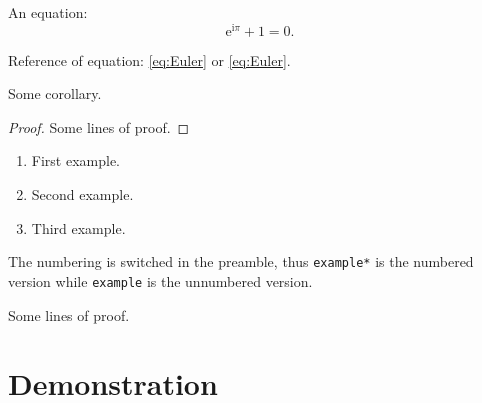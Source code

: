 \documentclass[a4paper, 11pt,
  use osf,
  use style = stream,
  title in boldface,
  theorem in new line,
  emphasize theorems,
  theorem numbering = section,
  simple name,  %
  name in link, %
]{simplivre}
\numberwithin{equation}{section}
\begin{document}
An equation:
\begin{equation}\label{eq:Euler}
  \mathrm{e}^{\mathrm{i}\pi} + 1 = 0.
\end{equation}

\begin{emphasis}
  Reference of equation: \eqref{eq:Euler} or \cref{eq:Euler}.
\end{emphasis}

\begin{corollary}\label{cor:result}
  Some corollary.
\end{corollary}
\begin{proof}
  Some lines of proof.
\end{proof}

\begin{examples}
  \begin{enumerate}
      \item First example.
      \item Second example.
      \item Third example.
  \end{enumerate}
\end{examples}

\begin{example*}
  The numbering is switched in the preamble, thus \verb|example*| is the numbered version while \verb|example| is the unnumbered version.
\end{example*}

\begin{proof*}
    Some lines of proof.
\end{proof*}

\part{Demonstration}

\blinddocument

\backmatter

\printindex
\end{document}
